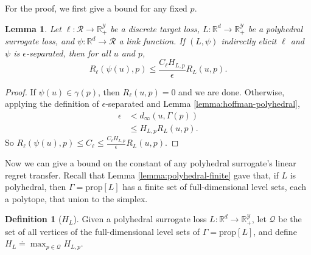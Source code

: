 \documentclass{article}
\newtheorem{lemma}{Lemma}
\theoremstyle{definition}\newtheorem{definition}{Definition}
\theoremstyle{definition}\newtheorem{assumption}{Assumption}
\newcommand{\reals}{\mathbb{R}}
\newcommand{\defeq}{\doteq}%
\newcommand{\prop}[1]{\mathrm{prop}[#1]}
\newcommand{\R}{\mathcal{R}}
\newcommand{\Y}{\mathcal{Y}}
\begin{document}
For the proof, we first give a bound for any fixed $p$.
\begin{lemma} \label{lemma:separated-constant-p}
  Let $\ell: \R \to \reals_+^{\Y}$ be a discrete target loss, $L: \reals^d \to \reals_+^{\Y}$ be a polyhedral surrogate loss, and $\psi: \reals^d \to \R$ a link function.
  If $(L,\psi)$ indirectly elicit $\ell$ and $\psi$ is $\epsilon$-separated, then for all $u$ and $p$,
    \[ R_{\ell}(\psi(u),p) \leq \frac{C_{\ell} H_{L,p}}{\epsilon} R_L(u,p) . \]
\end{lemma}
\begin{proof}
  If $\psi(u) \in \gamma(p)$, then $R_{\ell}(u,p) = 0$ and we are done.
  Otherwise, applying the definition of $\epsilon$-separated and Lemma \ref{lemma:hoffman-polyhedral},
  \begin{align*}
    \epsilon &<    d_{\infty}(u,\Gamma(p))  \\
             &\leq H_{L,p} R_L(u,p) .
  \end{align*}
  So $R_{\ell}(\psi(u),p) \leq C_{\ell} \leq \frac{C_{\ell} H_{L,p}}{\epsilon} R_L(u,p)$.
\end{proof}

Now we can give a bound on the constant of any polyhedral surrogate's linear regret transfer.
Recall that Lemma \ref{lemma:polyhedral-finite} gave that, if $L$ is polyhedral, then $\Gamma = \prop{L}$ has a finite set of full-dimensional level sets, each a polytope, that union to the simplex.
\begin{definition}[$H_L$]
  Given a polyhedral surrogate loss $L: \reals^d \to \reals_+^{\Y}$, let $\mathcal{Q}$ be the set of all vertices of the full-dimensional level sets of $\Gamma = \prop{L}$, and define $H_L \defeq \max_{p \in \mathcal{Q}} H_{L,p}$.
\end{definition}
\end{document}
